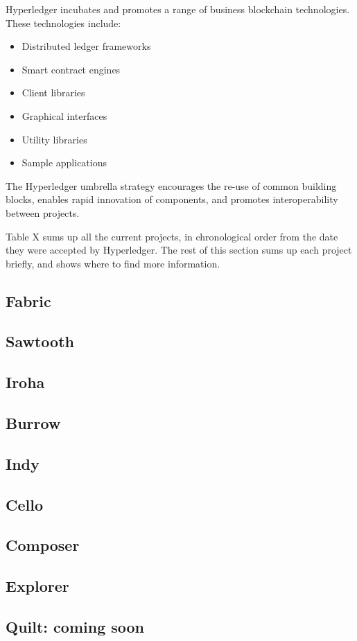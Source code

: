Hyperledger incubates and promotes a range of business blockchain technologies. These technologies include:  \begin{itemize}
\item Distributed ledger frameworks 
\item Smart contract engines 
\item Client libraries 
\item Graphical interfaces 
\item Utility libraries
\item Sample applications 
\end{itemize}

The Hyperledger umbrella strategy encourages the re-use of common building blocks, enables rapid innovation of components, and promotes interoperability between projects.  

Table X sums up all the current projects, in chronological order from the date they were accepted by  Hyperledger. The rest of this section sums up each project briefly, and shows where to find more information. 





\subsection{Fabric}


\subsection{Sawtooth}


\subsection{Iroha}


\subsection{Burrow}


\subsection{Indy}


\subsection{Cello}


\subsection{Composer}


\subsection{Explorer}


\subsection{Quilt: coming soon}


